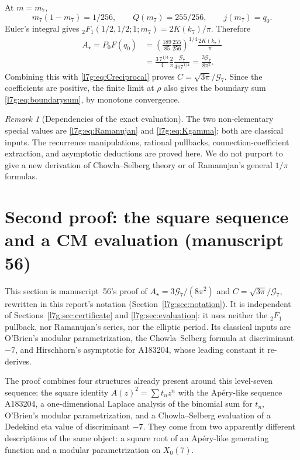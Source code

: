 \documentclass[11pt,letterpaper]{article}
\theoremstyle{remark}\newtheorem{remark}[theorem]{Remark}
\newcommand{\G}{\mathcal G_7}\newcommand{\Ast}{A_\star}
\newcounter{l7gtrsavedeq}
\begin{document}
At $m=m_7$,
\[
 m_7(1-m_7)=1/256,\qquad Q(m_7)=255/256,\qquad j(m_7)=q_0.
\]
Euler's integral gives
${}_2F_1(1/2,1/2;1;m_7)=2K(k_7)/\pi$. Therefore
\begin{align*}
 \Ast=P_0F(q_0)
 &=\left(\frac{189}{85}\frac{255}{256}\right)^{1/4}
                       \frac{2K(k_7)}\pi\\
 &=\frac{3\,7^{1/4}}4\frac2\pi
                       \frac{\G}{4\pi7^{1/4}}
 =\frac{3\G}{8\pi^2}.
\end{align*}
Combining this with \eqref{l7g:eq:Creciprocal} proves $C=\sqrt{3\pi}/\G$.
Since the coefficients are positive, the finite limit at $\rho$ also
gives the boundary sum \eqref{l7g:eq:boundarysum}, by monotone convergence.

\begin{remark}[Dependencies of the exact evaluation]
The two non-elementary special values are \eqref{l7g:eq:Ramanujan} and
\eqref{l7g:eq:Kgamma}; both are classical inputs. The recurrence
manipulations, rational pullbacks, connection-coefficient extraction,
and asymptotic deductions are proved here. We do not purport to give a
new derivation of Chowla--Selberg theory or of Ramanujan's general
$1/\pi$ formulas.
\end{remark}

\section{Second proof: the square sequence and a CM evaluation (manuscript 56)}\label{l7g:sec:second}
This section is manuscript~56's proof of $\Ast=3\G/(8\pi^2)$ and
$C=\sqrt{3\pi}/\G$, rewritten in this report's notation
(Section~\ref{l7g:sec:notation}). It is independent of
Sections~\ref{l7g:sec:certificate} and \ref{l7g:sec:evaluation}: it uses
neither the ${}_2F_1$ pullback, nor Ramanujan's series, nor the elliptic
period. Its classical inputs are O'Brien's modular parametrization, the
Chowla--Selberg formula at discriminant $-7$, and Hirschhorn's asymptotic
for A183204, whose leading constant it re-derives.

The proof combines four structures already present around this
level-seven sequence: the square identity $A(z)^2=\sum t_nz^n$ with the
Ap\'ery-like sequence A183204, a one-dimensional Laplace analysis of the
binomial sum for $t_n$, O'Brien's modular parametrization, and a
Chowla--Selberg evaluation of a Dedekind eta value of discriminant $-7$.
They come from two apparently different descriptions of the same object:
a square root of an Ap\'ery-like generating function and a modular
parametrization on $X_0(7)$.
\end{document}
